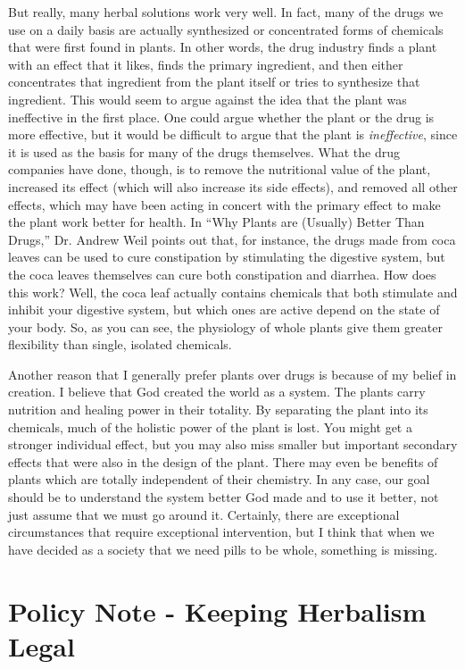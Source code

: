But really, many herbal solutions work very well.  In fact, many of the
drugs we use on a daily basis are actually synthesized or concentrated
forms of chemicals that were first found in plants. In other words, the
drug industry finds a plant with an effect that it likes, finds the
primary ingredient, and then either concentrates that ingredient from
the plant itself or tries to synthesize that ingredient.  This would
seem to argue against the idea that the plant was ineffective in the
first place. One could argue whether the plant or the drug is more
effective, but it would be difficult to argue that the plant is
\textit{ineffective}, since it is used as the basis for many of the
drugs themselves.  What the drug companies have done, though, is to
remove the nutritional value of the plant, increased its effect (which
will also increase its side effects), and removed all other effects,
which may have been acting in concert with the primary effect to make
the plant work better for health.  In “Why Plants are (Usually) Better
Than Drugs,” Dr. Andrew Weil points out that, for instance, the drugs
made from coca leaves can be used to cure constipation by stimulating
the digestive system, but the coca leaves themselves can cure both
constipation and diarrhea.  How does this work?  Well, the coca leaf
actually contains chemicals that both stimulate and inhibit your
digestive system, but which ones are active depend on the state of your
body.  So, as you can see, the physiology of whole plants give them
greater flexibility than single, isolated chemicals. 

Another reason that I generally prefer plants over drugs is because of
my belief in creation. I believe that God created the world as a
system. The plants carry nutrition and healing power in their totality.
By separating the plant into its chemicals, much of the holistic power
of the plant is lost. You might get a stronger individual effect, but
you may also miss smaller but important secondary effects that were
also in the design of the plant. There may even be benefits of plants
which are totally independent of their chemistry.  In any case, our
goal should be to understand the system better God made and to use it
better, not just assume that we must go around it. Certainly, there are
exceptional circumstances that require exceptional intervention, but I
think that when we have decided as a society that we need pills to be
whole, something is missing.

\section{Policy Note - Keeping Herbalism Legal}

